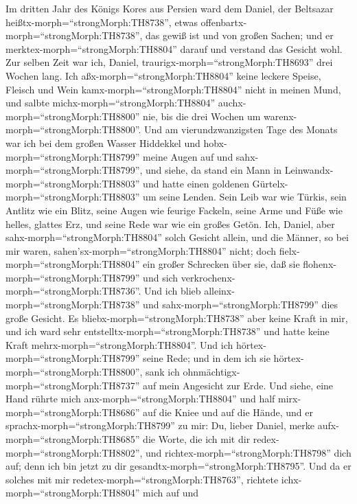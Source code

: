  Im dritten Jahr des Königs Kores aus Persien ward dem
Daniel, der Beltsazar heißtx-morph=``strongMorph:TH8738'', etwas
offenbartx-morph=``strongMorph:TH8738'', das gewiß ist und von großen
Sachen; und er merktex-morph=``strongMorph:TH8804'' darauf und verstand
das Gesicht wohl.  Zur selben Zeit war ich, Daniel,
traurigx-morph=``strongMorph:TH8693'' drei Wochen lang.  Ich
aßx-morph=``strongMorph:TH8804'' keine leckere Speise, Fleisch und Wein
kamx-morph=``strongMorph:TH8804'' nicht in meinen Mund, und salbte
michx-morph=``strongMorph:TH8804'' auchx-morph=``strongMorph:TH8800''
nie, bis die drei Wochen um warenx-morph=``strongMorph:TH8800''.
 Und am vierundzwanzigsten Tage des Monats war ich bei dem
großen Wasser Hiddekkel  und
hobx-morph=``strongMorph:TH8799'' meine Augen auf und
sahx-morph=``strongMorph:TH8799'', und siehe, da stand ein Mann in
Leinwandx-morph=``strongMorph:TH8803'' und hatte einen goldenen
Gürtelx-morph=``strongMorph:TH8803'' um seine Lenden.  Sein
Leib war wie Türkis, sein Antlitz wie ein Blitz, seine Augen wie feurige
Fackeln, seine Arme und Füße wie helles, glattes Erz, und seine Rede war
wie ein großes Getön.  Ich, Daniel, aber
sahx-morph=``strongMorph:TH8804'' solch Gesicht allein, und die Männer,
so bei mir waren, sahen'sx-morph=``strongMorph:TH8804'' nicht; doch
fielx-morph=``strongMorph:TH8804'' ein großer Schrecken über sie, daß
sie flohenx-morph=``strongMorph:TH8799'' und sich
verkrochenx-morph=``strongMorph:TH8736''.  Und ich blieb
alleinx-morph=``strongMorph:TH8738'' und
sahx-morph=``strongMorph:TH8799'' dies große Gesicht. Es
bliebx-morph=``strongMorph:TH8738'' aber keine Kraft in mir, und ich
ward sehr entstelltx-morph=``strongMorph:TH8738'' und hatte keine Kraft
mehrx-morph=``strongMorph:TH8804''.  Und ich
hörtex-morph=``strongMorph:TH8799'' seine Rede; und in dem ich sie
hörtex-morph=``strongMorph:TH8800'', sank ich
ohnmächtigx-morph=``strongMorph:TH8737'' auf mein Angesicht zur Erde.
 Und siehe, eine Hand rührte mich
anx-morph=``strongMorph:TH8804'' und half
mirx-morph=``strongMorph:TH8686'' auf die Kniee und auf die Hände,
 und er sprachx-morph=``strongMorph:TH8799'' zu mir: Du,
lieber Daniel, merke aufx-morph=``strongMorph:TH8685'' die Worte, die
ich mit dir redex-morph=``strongMorph:TH8802'', und
richtex-morph=``strongMorph:TH8798'' dich auf; denn ich bin jetzt zu dir
gesandtx-morph=``strongMorph:TH8795''. Und da er solches mit mir
redetex-morph=``strongMorph:TH8763'', richtete
ichx-morph=``strongMorph:TH8804'' mich auf und
